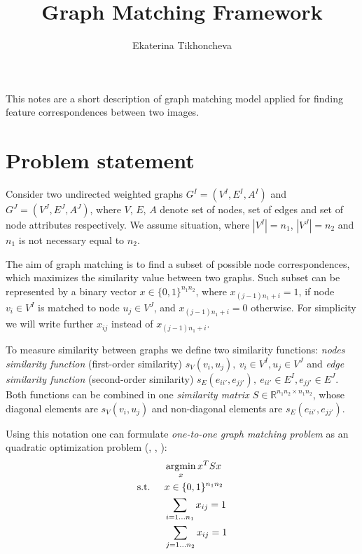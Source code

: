 \documentclass[
	fontsize=12pt,
	paper=a4,
	twoside=false,
	numbers=noenddot,
	plainheadsepline,
	toc=listof,
	toc=bibliography
]{scrartcl}
\begin{document}
\pagestyle{plain}

\title{Graph Matching Framework}
\author{Ekaterina Tikhoncheva}
\date{} 

\maketitle 

This notes are a short description of graph matching model applied for finding feature correspondences between two images.

\tableofcontents
\newpage

\section{Problem statement}
Consider two undirected weighted graphs $G^I = (V^I, E^I, A^I)$ and $G^J = (V^J, E^J, A^J)$, where $V$, $E$, $A$ denote set of nodes,
set of edges and set of node attributes respectively. We assume situation, where $|V^I|=n_1$, $|V^J|=n_2$ and $n_1$ is not necessary equal to $n_2$.

The aim of graph matching is to find a subset of possible node correspondences, which maximizes the similarity value between two graphs. Such subset can be represented by a binary vector $x\in \{0,1\}^{n_1n_2}$, where $x_{(j-1)n_1+i}=1$, if node $v_i\in V^I$ is matched to node $u_j\in V^J$, and $x_{(j-1)n_1+i}=0$ otherwise. For simplicity we will write further $x_{ij}$ instead of $x_{(j-1)n_1+i}$.

To measure similarity between graphs we define two similarity functions: \emph{nodes similarity function} (first-order similarity) $s_V(v_i, u_j),\ v_i\in V^I, u_j\in V^J$ and \emph{edge similarity function} (second-order similarity) $s_E(e_{ii'}, e_{jj'}),\ e_{ii'}\in E^I, e_{jj'}\in E^J$. Both functions can be combined in one \emph{similarity matrix $S\in\mathbb{R}^{n_1n_2\times n_1n_2}$}, whose diagonal elements are $s_V(v_i, u_j)$ and non-diagonal elements are $s_E(e_{ii'}, e_{jj'})$.


Using this notation one can formulate \emph{one-to-one graph matching problem} as an quadratic optimization problem (\cite{Cho2014_Haystack}, \cite{Cho2012_ProgressiveGM}, \cite{Cho2010_RRWM}): 
\begin{alignat}{2}
    &     && \argmin_x{x^TSx}                           \label{QIP::1}\\
    & \text{s.t. } &&  x\in \{0,1\}^{n_1n_2}            \label{QIP::2}\\
    &             &&  \sum_{i=1\dots n_1} x_{ij} = 1    \label{QIP::3}\\
    &             &&  \sum_{j=1\dots n_2} x_{ij} = 1    \label{QIP::4}
 \end{alignat}
 
\end{document}
